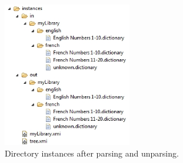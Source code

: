 \begin{enumerate}
\begin{figure}[!htbp]
\begin{center}
 \includegraphics[width=0.5\textwidth]{pics/moca/5MocaTreeToText/InstancesAfterRoundTrip}
  \caption{Directory instances after parsing and unparsing.} 
  \label{fig:moca-FinalResults}
\end{center}
\end{figure}

\end{enumerate}